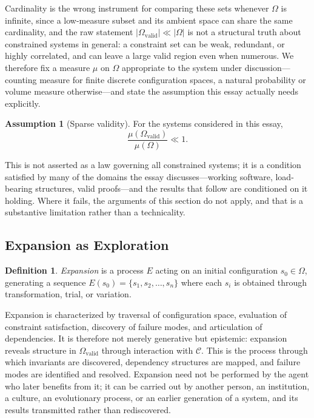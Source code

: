 \documentclass[12pt, a4paper]{article}
\theoremstyle{plain}
\theoremstyle{definition}
\newtheorem{definition}[proposition]{Definition}
\newtheorem{assumption}[proposition]{Assumption}
\theoremstyle{remark}
\begin{document}
Cardinality is the wrong instrument for comparing these sets whenever $\Omega$ is infinite, since a low-measure subset and its ambient space can share the same cardinality, and the raw statement $|\Omega_{\mathrm{valid}}| \ll |\Omega|$ is not a structural truth about constrained systems in general: a constraint set can be weak, redundant, or highly correlated, and can leave a large valid region even when numerous. We therefore fix a measure $\mu$ on $\Omega$ appropriate to the system under discussion---counting measure for finite discrete configuration spaces, a natural probability or volume measure otherwise---and state the assumption this essay actually needs explicitly.

\begin{assumption}[Sparse validity]
\label{ass:sparse}
For the systems considered in this essay,
\[
\frac{\mu(\Omega_{\mathrm{valid}})}{\mu(\Omega)} \ll 1.
\]
\end{assumption}

This is not asserted as a law governing all constrained systems; it is a condition satisfied by many of the domains the essay discusses---working software, load-bearing structures, valid proofs---and the results that follow are conditioned on it holding. Where it fails, the arguments of this section do not apply, and that is a substantive limitation rather than a technicality.

\subsection{Expansion as Exploration}
\label{subsec:expansion}

\begin{definition}
\emph{Expansion} is a process $E$ acting on an initial configuration $s_0 \in \Omega$, generating a sequence $E(s_0) = \{s_1, s_2, \dots, s_n\}$ where each $s_i$ is obtained through transformation, trial, or variation.
\end{definition}

Expansion is characterized by traversal of configuration space, evaluation of constraint satisfaction, discovery of failure modes, and articulation of dependencies. It is therefore not merely generative but epistemic: expansion reveals structure in $\Omega_{\mathrm{valid}}$ through interaction with $\mathcal{C}$. This is the process through which invariants are discovered, dependency structures are mapped, and failure modes are identified and resolved. Expansion need not be performed by the agent who later benefits from it; it can be carried out by another person, an institution, a culture, an evolutionary process, or an earlier generation of a system, and its results transmitted rather than rediscovered.
\end{document}
